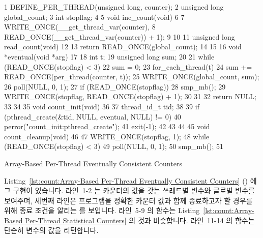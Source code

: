\begin{listing}[tbp]
{ \scriptsize
\begin{verbbox}
 1 DEFINE_PER_THREAD(unsigned long, counter);
 2 unsigned long global_count;
 3 int stopflag;
 4
 5 void inc_count(void)
 6 {
 7   WRITE_ONCE(__get_thread_var(counter),
 8              READ_ONCE(__get_thread_var(counter)) + 1);
 9 }
10
11 unsigned long read_count(void)
12 {
13   return READ_ONCE(global_count);
14 }
15
16 void *eventual(void *arg)
17 {
18   int t;
19   unsigned long sum;
20
21   while (READ_ONCE(stopflag) < 3) {
22     sum = 0;
23     for_each_thread(t)
24       sum += READ_ONCE(per_thread(counter, t));
25     WRITE_ONCE(global_count, sum);
26     poll(NULL, 0, 1);
27     if (READ_ONCE(stopflag)) {
28       smp_mb();
29       WRITE_ONCE(stopflag, READ_ONCE(stopflag) + 1);
30     }
31   }
32   return NULL;
33 }
34
35 void count_init(void)
36 {
37   thread_id_t tid;
38
39   if (pthread_create(&tid, NULL, eventual, NULL) != 0) {
40     perror("count_init:pthread_create");
41     exit(-1);
42   }
43 }
44
45 void count_cleanup(void)
46 {
47   WRITE_ONCE(stopflag, 1);
48   while (READ_ONCE(stopflag) < 3)
49     poll(NULL, 0, 1);
50   smp_mb();
51 }
\end{verbbox}
}
\centering
\theverbbox
\caption{Array-Based Per-Thread Eventually Consistent Counters}
\label{lst:count:Array-Based Per-Thread Eventually Consistent Counters}
\end{listing}

Listing~\ref{lst:count:Array-Based Per-Thread Eventually Consistent Counters}
() 에 그 구현이 있습니다.
라인~1-2 는 카운터의 값을 갖는 쓰레드별 변수와 글로벌 변수를 보여주며, 세번째
라인은 프로그램을 정확한 카운터 값과 함께 종료하고자 할 경우를 위해 종료 조건을
알리는  를 보입니다.
라인~5-9 의  함수는
Listing~\ref{lst:count:Array-Based Per-Thread Statistical Counters} 의 것과
비슷합니다.
라인~11-14 의  함수는 단순히  변수의 값을
리턴합니다.


